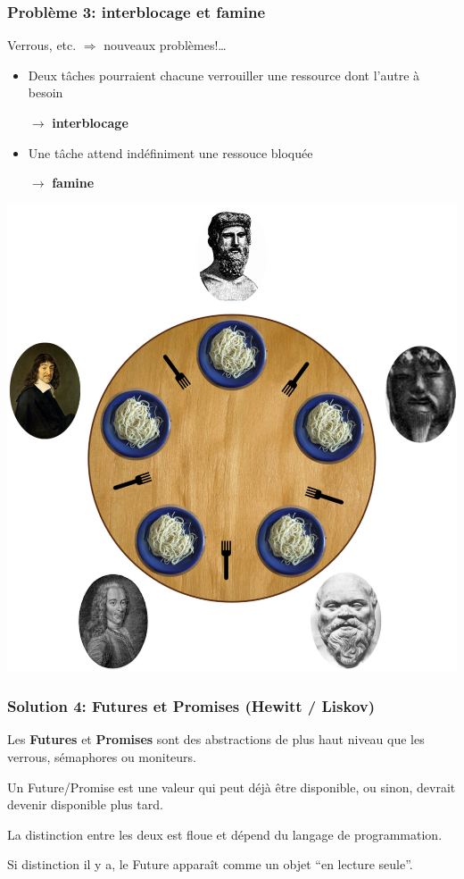 \documentclass{beamer}
\begin{document}
\begin{frame}
  \frametitle{Problème 3: \textbf{interblocage} et \textbf{famine}}
  \begin{minipage}{.55\textwidth}
    Verrous, etc. $\Rightarrow$ nouveaux problèmes!\ldots
    \bigskip
    \begin{itemize}
     \item Deux tâches pourraient chacune verrouiller une ressource dont l'autre
       à besoin\par
       $\rightarrow$ \textbf{interblocage}
     \item Une tâche attend indéfiniment une ressouce bloquée\par
       $\rightarrow$ \textbf{famine}
    \end{itemize}
  \end{minipage}
  \;\;
  \begin{minipage}{.39\textwidth}
    \includegraphics[width=.7\textwidth]{philosophes.png}
  \end{minipage}
\end{frame} %
\begin{frame}
  \frametitle{Solution 4: Futures et Promises (Hewitt / Liskov)}
  Les \textbf{Futures} et \textbf{Promises} sont des abstractions
  de plus haut niveau que les verrous, sémaphores ou moniteurs.
  \bigskip

  Un Future/Promise est une valeur qui peut déjà être disponible, ou sinon,
  devrait devenir disponible plus tard.
  \bigskip

  La distinction entre les deux est floue et dépend du langage de
  programmation.

  Si distinction il y a, le Future apparaît comme un objet
  ``en lecture seule''.
\end{frame} %
\end{document}
